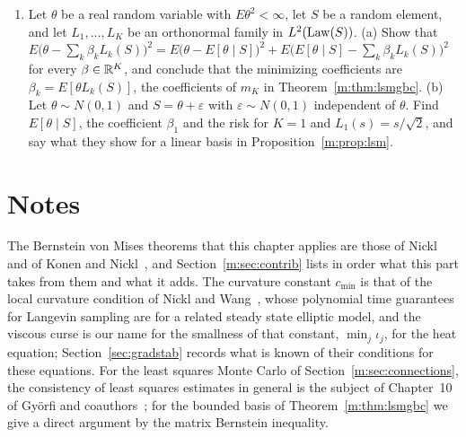 \begin{enumerate}
\item Let $\theta$ be a real random variable with $E\theta^2<\infty$, let $S$ be a random element, and let $L_1,\dots,L_K$ be an orthonormal family in $L^2(\operatorname{Law}(S))$. (a) Show that $E\big(\theta-\sum_k\beta_kL_k(S)\big)^2=E\big(\theta-E[\theta\mid S]\big)^2+E\big(E[\theta\mid S]-\sum_k\beta_kL_k(S)\big)^2$ for every $\beta\in\mathbb{R}^K$, and conclude that the minimizing coefficients are $\beta_k=E[\theta L_k(S)]$, the coefficients of $m_K$ in Theorem~\ref{m:thm:lsmgbc}. (b) Let $\theta\sim N(0,1)$ and $S=\theta+\varepsilon$ with $\varepsilon\sim N(0,1)$ independent of $\theta$. Find $E[\theta\mid S]$, the coefficient $\beta_1$ and the risk for $K=1$ and $L_1(s)=s/\sqrt2$, and say what they show for a linear basis in Proposition~\ref{m:prop:lsm}.
\end{enumerate}

\section*{Notes}

The Bernstein von Mises theorems that this chapter applies are those of Nickl~\cite{nicklbvm2024} and of Konen and Nickl~\cite{konennickl2026}, and Section~\ref{m:sec:contrib} lists in order what this part takes from them and what it adds. The curvature constant $c_{\min}$ is that of the local curvature condition of Nickl and Wang~\cite{nicklwang2024}, whose polynomial time guarantees for Langevin sampling are for a related steady state elliptic model, and the viscous curse is our name for the smallness of that constant, $\min_j\iota_j$, for the heat equation; Section~\ref{sec:gradstab} records what is known of their conditions for these equations. For the least squares Monte Carlo of Section~\ref{m:sec:connections}, the consistency of least squares estimates in general is the subject of Chapter~10 of Gy\"orfi and coauthors~\cite{gyorfi2002}; for the bounded basis of Theorem~\ref{m:thm:lsmgbc} we give a direct argument by the matrix Bernstein inequality.

